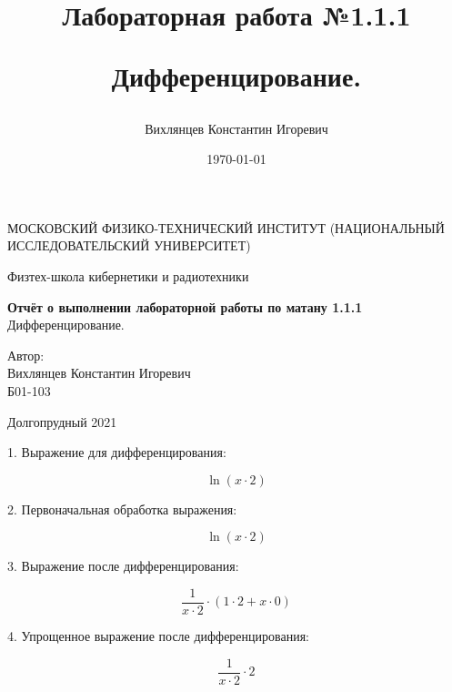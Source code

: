 \documentclass[a4paper,12pt]{article} %
\author{Вихлянцев Константин Игоревич}
\title{Лабораторная работа №1.1.1

Дифференцирование.
}
\date{\today}
\begin{document}
\begin{titlepage}
	\begin{center}
		{\large МОСКОВСКИЙ ФИЗИКО-ТЕХНИЧЕСКИЙ ИНСТИТУТ (НАЦИОНАЛЬНЫЙ ИССЛЕДОВАТЕЛЬСКИЙ УНИВЕРСИТЕТ)}
	\end{center}
	\begin{center}
		{\large Физтех-школа кибернетики и радиотехники}
	\end{center}
	
	
	\vspace{1cm}
	{\huge
		\begin{center}
			{\bf Отчёт о выполнении лабораторной работы по матану 1.1.1}\\
			Дифференцирование.
		\end{center}
	}
	\vspace{1cm}
	\begin{flushright}
		{\LARGE Автор:\\ Вихлянцев Константин Игоревич \\
			\vspace{0.2cm}
			Б01-103}
	\end{flushright}
	\vspace{1cm}
	\begin{center}
		Долгопрудный 2021
	\end{center}
\end{titlepage}

1. Выражение для дифференцирования:

\[\ln{({x}\cdot{2})}\]

2. Первоначальная обработка выражения:

\[\ln{({x}\cdot{2})}\]

3. Выражение после дифференцирования:

\[{\frac{1}{{x}\cdot{2}}}\cdot{({1}\cdot{2}+{x}\cdot{0})}\]

4. Упрощенное выражение после дифференцирования:

\[{\frac{1}{{x}\cdot{2}}}\cdot{2}\]
\end{document}
